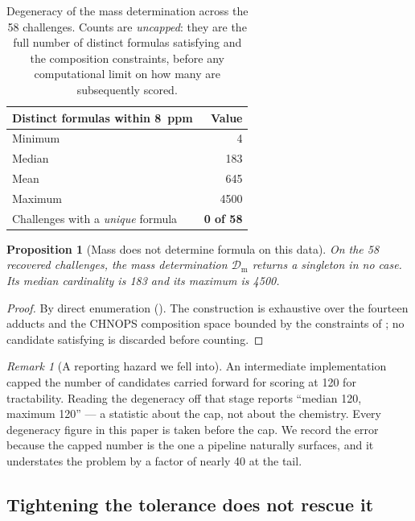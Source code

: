 \documentclass[11pt,twocolumn,a4paper]{article}
\newtheorem{proposition}[theorem]{Proposition}
\theoremstyle{definition}
\theoremstyle{remark}
\newtheorem{remark}[theorem]{Remark}
\newcommand{\Dmass}{\mathcal{D}_{\mathrm{m}}}
\begin{document}
\begin{table}[!htbp]
\centering
\caption{Degeneracy of the mass determination across the 58 challenges. Counts
are \emph{uncapped}: they are the full number of distinct formulas satisfying
 and the composition constraints, before any computational limit on
how many are subsequently scored.}
\label{tab:degeneracy}
\begin{tabular}{lr}
\toprule
Distinct formulas within 8~ppm & Value \\
\midrule
Minimum                                  & 4 \\
Median                                   & 183 \\
Mean                                     & 645 \\
Maximum                                  & 4500 \\
\midrule
Challenges with a \emph{unique} formula   & \textbf{0 of 58} \\
\bottomrule
\end{tabular}
\end{table}

\begin{proposition}[Mass does not determine formula on this data]
\label{prop:degeneracy}
On the 58 recovered challenges, the mass determination $\Dmass$ returns a
singleton in no case. Its median cardinality is 183 and its maximum is 4500.
\end{proposition}

\begin{proof}
By direct enumeration (). The construction is exhaustive over
the fourteen adducts and the CHNOPS composition space bounded by the constraints
of ; no candidate satisfying  is discarded before
counting.
\end{proof}

\begin{remark}[A reporting hazard we fell into]
An intermediate implementation capped the number of candidates carried forward
for scoring at 120 for tractability. Reading the degeneracy off that stage
reports ``median 120, maximum 120'' --- a statistic about the cap, not about the
chemistry. Every degeneracy figure in this paper is taken before the cap. We
record the error because the capped number is the one a pipeline naturally
surfaces, and it understates the problem by a factor of nearly 40 at the tail.
\end{remark}

\subsection{Tightening the tolerance does not rescue it}
\end{document}

